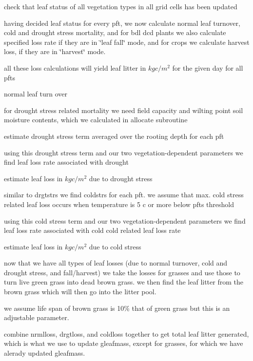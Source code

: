check that leaf status of all vegetation types in all grid cells has been updated





having decided leaf status for every pft, we now calculate normal leaf turnover, cold and drought stress mortality, and for bdl dcd plants we also calculate specified loss rate if they are in \char`\"{}leaf fall\char`\"{} mode, and for crops we calculate harvest loss, if they are in \char`\"{}harvest\char`\"{} mode.

all these loss calculations will yield leaf litter in $kg c/m^2$ for the given day for all pfts

normal leaf turn over

for drought stress related mortality we need field capacity and wilting point soil moisture contents, which we calculated in allocate subroutine

estimate drought stress term averaged over the rooting depth for each pft

\begin{DoxyVerb}    using this drought stress term and our two vegetation-dependent
    parameters we find leaf loss rate associated with drought \end{DoxyVerb}


estimate leaf loss in $kg c/m^2$ due to drought stress

similar to drgtstrs we find coldstrs for each pft. we assume that max. cold stress related leaf loss occurs when temperature is 5 c or more below pft\textquotesingle{}s threshold

using this cold stress term and our two vegetation-\/dependent parameters we find leaf loss rate associated with cold cold related leaf loss rate

estimate leaf loss in $kg c/m^2$ due to cold stress

now that we have all types of leaf losses (due to normal turnover, cold and drought stress, and fall/harvest) we take the losses for grasses and use those to turn live green grass into dead brown grass. we then find the leaf litter from the brown grass which will then go into the litter pool.

we assume life span of brown grass is 10\% that of green grass but this is an adjustable parameter.

combine nrmlloss, drgtloss, and coldloss together to get total leaf litter generated, which is what we use to update gleafmass, except for grasses, for which we have alerady updated gleafmass.